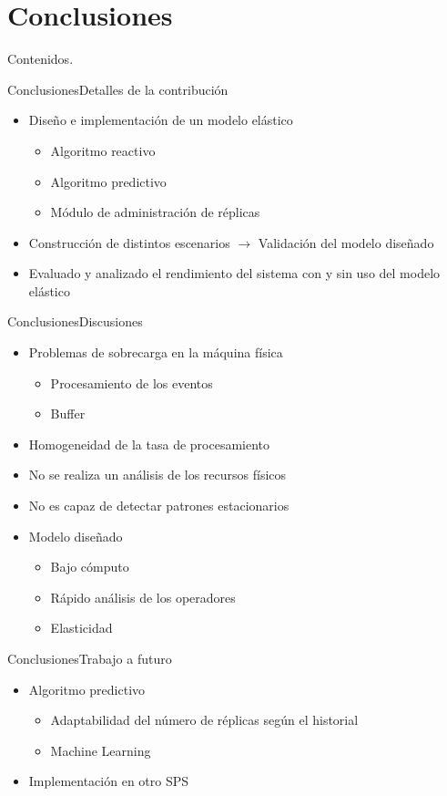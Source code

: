 \section{Conclusiones}

\addtocounter{framenumber}{-1}
\begin{frame}[t]{Contenidos}{\textcolor{UniBlue}{.}}
	\tableofcontents[currentsection]
\end{frame}

\begin{frame}{Conclusiones}{Detalles de la contribución}

\begin{itemize}
\item Diseño e implementación de un modelo elástico
\begin{itemize}
	\item Algoritmo reactivo
	\item Algoritmo predictivo
	\item Módulo de administración de réplicas
\end{itemize}
\item Construcción de distintos escenarios $\rightarrow$ Validación del modelo diseñado
\item Evaluado y analizado el rendimiento del sistema con y sin uso del modelo elástico
\end{itemize}

\end{frame}

\begin{frame}{Conclusiones}{Discusiones}

\begin{itemize}
\item Problemas de sobrecarga en la máquina física
\begin{itemize}
	\item Procesamiento de los eventos
	\item Buffer
\end{itemize}
\item Homogeneidad de la tasa de procesamiento
\item No se realiza un análisis de los recursos físicos
\item No es capaz de detectar patrones estacionarios
\item Modelo diseñado
	\begin{itemize}
		\item Bajo cómputo
		\item Rápido análisis de los operadores
		\item Elasticidad
	\end{itemize}
\end{itemize}

\end{frame}

\begin{frame}{Conclusiones}{Trabajo a futuro}

\begin{itemize}
\item Algoritmo predictivo
\begin{itemize}
	\item Adaptabilidad del número de réplicas según el historial
	\item Machine Learning
\end{itemize}
\item Implementación en otro SPS
\end{itemize}

\end{frame}